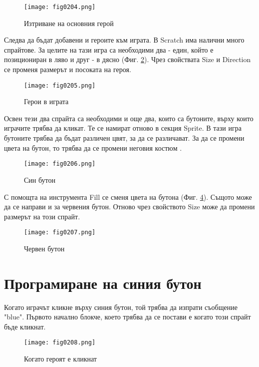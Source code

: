 \begin{figure}[H]
  \centering
  \texttt{[image: fig0204.png]}
  \caption{Изтриване на основния герой}
\label{fig0204}
\end{figure}

Следва да бъдат добавени и героите към играта. В Scratch има налични много спрайтове. За целите на тази игра са необходими два - един, който е позициониран в ляво и друг - в дясно (Фиг. \ref{fig0205}). Чрез свойствата Size и Direction се променя размерът и посоката на героя.

\begin{figure}[H]
  \centering
  \texttt{[image: fig0205.png]}
  \caption{Герои в играта}
\label{fig0205}
\end{figure}

Освен тези два спрайта са необходими и още два, които са бутоните, върху които играчите трябва да кликат. Те се намират отново в секция Sprite. В тази игра бутоните трябва да бъдат различен цвят, за да се различават. За да се промени цвета на бутон, то трябва да се промени неговия костюм .

\begin{figure}[H]
  \centering
  \texttt{[image: fig0206.png]}
  \caption{Син бутон}
\label{fig0206}
\end{figure}

С помощта на инструмента Fill се сменя цвета на бутона (Фиг. \ref{fig0207}). Същото може да се направи и за червения бутон. Отново чрез свойството Size може да промени размерът на този спрайт.

\begin{figure}[H]
  \centering
  \texttt{[image: fig0207.png]}
  \caption{Червен бутон}
\label{fig0207}
\end{figure}

\section{Програмиране на синия бутон}
Когато играчът кликне върху синия бутон, той трябва да изпрати съобщение "blue". Първото начално блокче, което трябва да се постави е когато този спрайт бъде кликнат.

\begin{figure}[H]
  \centering
  \texttt{[image: fig0208.png]}
  \caption{Когато героят е кликнат}
\label{fig0208}
\end{figure}

